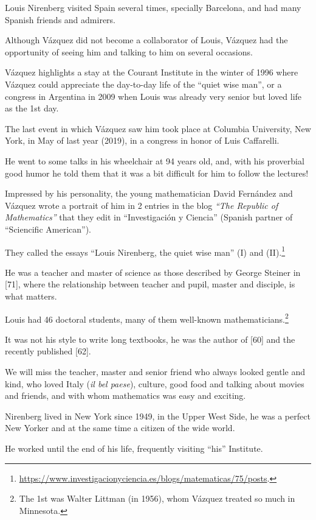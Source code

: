 \documentclass{article}
\begin{document}
Louis Nirenberg visited Spain several times, specially Barcelona, and had many Spanish friends and admirers.

%
Although V\'azquez did not become a collaborator of Louis, V\'azquez had the opportunity of seeing him and talking to him on several occasions.

V\'azquez highlights a stay at the Courant Institute in the winter of 1996 where V\'azquez could appreciate the day-to-day life of the ``quiet wise man'', or a congress in Argentina in 2009 when Louis was already very senior but loved life as the 1st day.

The last event in which V\'azquez saw him took place at Columbia University, New York, in May of last year (2019), in a congress in honor of Luis Caffarelli.

He went to some talks in his wheelchair at 94 years old, and, with his proverbial good humor he told them that it was a bit difficult for him to follow the lectures!

%
Impressed by his personality, the young mathematician David Fern\'andez and V\'azquez wrote a portrait of him in 2 entries in the blog \textit{``The Republic of Mathematics''} that they edit in ``Investigaci\'on y Ciencia'' (Spanish partner of ``Sciencific American'').

They called the essays ``Louis Nirenberg, the quiet wise man'' (I) and (II).\footnote{\url{https://www.investigacionyciencia.es/blogs/matematicas/75/posts}.}

He was a teacher and master of science as those described by George Steiner in [71], where the relationship between teacher and pupil, master and disciple, is what matters.

Louis had 46 doctoral students, many of them well-known mathematicians.\footnote{The 1st was Walter Littman (in 1956), whom V\'azquez treated so much in Minnesota.}

It was not his style to write long textbooks, he was the author of [60] and the recently published [62].

%
We will miss the teacher, master and senior friend who always looked gentle and kind, who loved Italy (\textit{il bel paese}), culture, good food and talking about movies and friends, and with whom mathematics was easy and exciting.

Nirenberg lived in New York since 1949, in the Upper West Side, he was a perfect New Yorker and at the same time a citizen of the wide world.

He worked until the end of his life, frequently visiting ``his'' Institute.
\end{document}
